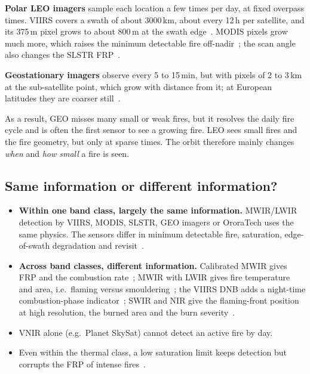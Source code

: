 \documentclass[11pt]{article}
\begin{document}
\textbf{Polar LEO imagers} sample each location a few times per day, at fixed overpass times. VIIRS covers a swath of about 3000\,km, about every 12\,h per satellite, and its 375\,m pixel grows to about 800\,m at the swath edge~\cite{schroeder2014viirs}. MODIS pixels grow much more, which raises the minimum detectable fire off-nadir~\cite{giglio2016modis}; the scan angle also changes the SLSTR FRP~\cite{xu2020slstr}.

\textbf{Geostationary imagers} observe every 5 to 15\,min, but with pixels of 2 to 3\,km at the sub-satellite point, which grow with distance from it; at European latitudes they are coarser still~\cite{wooster2015seviri,schmidt2020goesr}.

As a result, GEO misses many small or weak fires, but it resolves the daily fire cycle and is often the first sensor to see a growing fire. LEO sees small fires and the fire geometry, but only at sparse times. The orbit therefore mainly changes \emph{when} and \emph{how small} a fire is seen.

\subsection{Same information or different information?}

\begin{itemize}[leftmargin=1.2cm]
    \item \textbf{Within one band class, largely the same information.} MWIR/LWIR detection by VIIRS, MODIS, SLSTR, GEO imagers or OroraTech uses the same physics. The sensors differ in minimum detectable fire, saturation, edge-of-swath degradation and revisit~\cite{giglio2016modis,schroeder2014viirs,xu2020slstr,wooster2015seviri}.
    \item \textbf{Across band classes, different information.} Calibrated MWIR gives FRP and the combustion rate~\cite{wooster2005frp}; MWIR with LWIR gives fire temperature and area, i.e.\ flaming versus smouldering~\cite{dozier1981}; the VIIRS DNB adds a night-time combustion-phase indicator~\cite{wang2020dnb}; SWIR and NIR give the flaming-front position at high resolution, the burned area and the burn severity~\cite{schroeder2016landsat,keybenson2006}.
    \item VNIR alone (e.g.\ Planet SkySat) cannot detect an active fire by day.
    \item Even within the thermal class, a low saturation limit keeps detection but corrupts the FRP of intense fires~\cite{schroeder2014viirs}.
\end{itemize}
\end{document}
